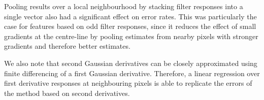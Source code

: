 \label{s:exp_retinogram_orientation_wrt_window_size}
Pooling results over a local neighbourhood by stacking filter responses into a single vector also had a significant effect on error rates. This was particularly the case for features based on odd filter responses, since it reduces the effect of small gradients at the centre-line by pooling estimates from nearby pixels with stronger gradients and therefore better estimates.

We also note that second Gaussian derivatives can be closely approximated using finite differencing of a first Gaussian derivative. Therefore, a linear regression over first derivative responses at neighbouring pixels is able to replicate the errors of the method based on second derivatives.
